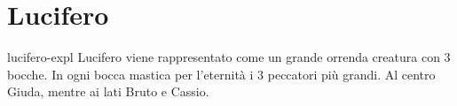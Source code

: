 \documentclass[preview]{standalone}
\begin{document}

\section{Lucifero}

\begin{snippet}{lucifero-expl}
    Lucifero viene rappresentato come un grande orrenda creatura con 3 bocche.
    In ogni bocca mastica per l'eternità i 3 peccatori più grandi.
    Al centro Giuda, mentre ai lati Bruto e Cassio.
\end{snippet}
\end{document}
